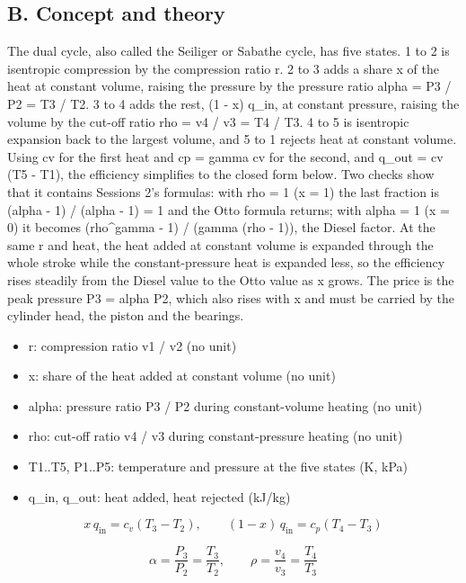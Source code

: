 \documentclass[11pt,a4paper]{article}
\begin{document}
\subsection*{B. Concept and theory}
The dual cycle, also called the Seiliger or Sabathe cycle, has five states. 1 to 2 is isentropic compression by the compression ratio r. 2 to 3 adds a share x of the heat at constant volume, raising the pressure by the pressure ratio alpha = P3 / P2 = T3 / T2. 3 to 4 adds the rest, (1 - x) q\_in, at constant pressure, raising the volume by the cut-off ratio rho = v4 / v3 = T4 / T3. 4 to 5 is isentropic expansion back to the largest volume, and 5 to 1 rejects heat at constant volume. Using cv for the first heat and cp = gamma cv for the second, and q\_out = cv (T5 - T1), the efficiency simplifies to the closed form below. Two checks show that it contains Sessions 2's formulas: with rho = 1 (x = 1) the last fraction is (alpha - 1) / (alpha - 1) = 1 and the Otto formula returns; with alpha = 1 (x = 0) it becomes (rho\textasciicircum{}gamma - 1) / (gamma (rho - 1)), the Diesel factor. At the same r and heat, the heat added at constant volume is expanded through the whole stroke while the constant-pressure heat is expanded less, so the efficiency rises steadily from the Diesel value to the Otto value as x grows. The price is the peak pressure P3 = alpha P2, which also rises with x and must be carried by the cylinder head, the piston and the bearings.

\begin{itemize}[nosep]
\item r: compression ratio v1 / v2 (no unit)
\item x: share of the heat added at constant volume (no unit)
\item alpha: pressure ratio P3 / P2 during constant-volume heating (no unit)
\item rho: cut-off ratio v4 / v3 during constant-pressure heating (no unit)
\item T1..T5, P1..P5: temperature and pressure at the five states (K, kPa)
\item q\_in, q\_out: heat added, heat rejected (kJ/kg)
\end{itemize}

\begin{equation*}
x\,q_{\mathrm{in}} = c_v (T_3 - T_2),\qquad (1-x)\,q_{\mathrm{in}} = c_p (T_4 - T_3)
\end{equation*}

\begin{equation*}
\alpha = \frac{P_3}{P_2} = \frac{T_3}{T_2},\qquad \rho = \frac{v_4}{v_3} = \frac{T_4}{T_3}
\end{equation*}
\end{document}

